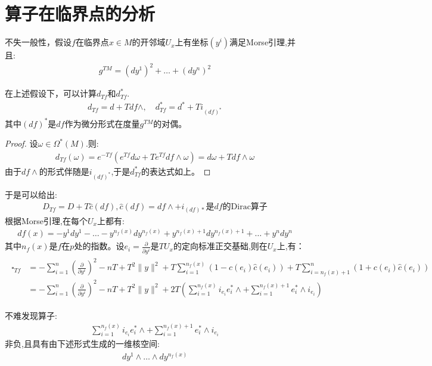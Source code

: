 \section{算子在临界点的分析}
不失一般性，假设$f$在临界点$x \in M$的开邻域$U_x$上有坐标$(y^i)$满足Morse引理,并且:
\begin{align}
	g^{TM}=(dy^1)^2+\dots+(dy^n)^2
\end{align}
\begin{proposition}
   在上述假设下，可以计算$d_{Tf}$和$d_{Tf}^*$.
    \begin{align}
	d_{Tf}=d+Tdf\wedge, \quad d_{Tf}^*=d^*+Ti_{(df)^*}
    \end{align}
其中$(df)^*$是$df$作为微分形式在度量$g^{TM}$的对偶。
\end{proposition}
\begin{proof}
	设$\omega \in \Omega^*(M)$.则:
	\begin{align}
		d_{Tf}(\omega)=e^{-Tf}(e^{Tf}d\omega+Te^{Tf}df\wedge \omega)=d\omega+Tdf\wedge \omega
	\end{align}
	由于$df\wedge$的形式伴随是$i_{(df)^*}$,于是$d_{Tf}^*$的表达式如上。
\end{proof}
于是可以给出:
\begin{align}
	D_{Tf}=D+T\hat{c}(df),\hat{c}(df)=df\wedge+i_{(df)*} \text{是}df\text{的Dirac算子}
\end{align}
根据Morse引理,在每个$U_x$上都有:
\begin{align}
	df(x)=-y^1dy^1-\dots-y^{n_f(x)}dy^{n_f(x)}+y^{n_f(x)+1}dy^{n_f(x)+1}+\dots+y^ndy^n
\end{align}
其中$n_f(x)$是$f$在$p$处的指数。设$e_i=\frac{\partial}{\partial y^i}$是$TU_x$的定向标准正交基础,则在$U_x$上,有：
\begin{align}
\begin{split}
	\square_{Tf}&=-\sum_{i=1}^n (\frac{\partial}{\partial y^i})^2-nT+T^2\|y\|^2+T\sum_{i=1}^{n_f(x)}(1-c(e_i)\hat{c}(e_i))+T\sum_{i=n_f(x)+1}^n(1+c(e_i)\hat{c}(e_i))\\&=-\sum_{i=1}^n (\frac{\partial}{\partial y^i})^2-nT+T^2\|y\|^2+2T(\sum_{i=1}^{n_f(x)}i_{e_i}e_i^*\wedge+\sum_{i=1}^{n_f(x)+1}e_i^*\wedge i_{e_i})
\end{split}	
\end{align}

不难发现算子:
\begin{align*}
	\sum_{i=1}^{n_f(x)}i_{e_i}e_i^*\wedge+\sum_{i=1}^{n_f(x)+1}e_i^*\wedge i_{e_i}
\end{align*}
非负,且具有由下述形式生成的一维核空间:
\begin{align*}
	dy^1\wedge \dots \wedge dy^{n_f(x)}
\end{align*}

